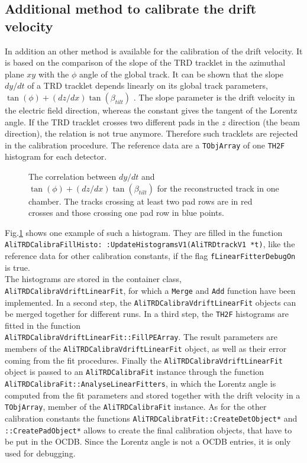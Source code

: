 \documentclass{alicetdr}
\begin{document}
\subsection{Additional method to calibrate the drift velocity}
In addition an other method is available for the calibration of the
drift velocity. It is based on the comparison of the slope of the TRD
tracklet in the azimuthal plane $xy$ with the $\phi$ angle of the
global track. It can be shown that the slope $dy/dt$ of a TRD tracklet
depends linearly on its global track parameters,
$\tan(\phi)+(dz/dx)\tan(\beta_{tilt})$ \cite{THESISR}. The slope
parameter is the drift velocity in the electric field direction,
whereas the constant gives the tangent of the Lorentz angle. If the
TRD tracklet crosses two different pads in the $z$ direction (the
beam direction), the relation is not true anymore. Therefore such
tracklets are rejected in the calibration procedure. The reference
data are a {\tt TObjArray} of one {\tt TH2F} histogram for each
detector.\\
\begin{figure}[hbt]
  \centering\mbox{}
  \caption{\label{crossrow}The correlation between $dy/dt$ and
$\tan(\phi)+(dz/dx)\tan(\beta_{tilt})$ for the reconstructed track
in one chamber. The tracks crossing at least two pad rows are in
red crosses and those crossing one pad row in blue points.}
\end{figure}

Fig.\ref{crossrow} shows one example of such a histogram. They are
filled in the function
\\{\tt AliTRDCalibraFillHisto: :UpdateHistogramsV1(AliTRDtrackV1 *t)},
like the reference data for other calibration constants, if the
flag {\tt fLinearFitterDebugOn} is true.\\
The histograms are stored in the container class,
\\{\tt AliTRDCalibraVdriftLinearFit}, for which a {\tt Merge} and
{\tt Add} function have been implemented. In a second step, the
{\tt AliTRDCalibraVdriftLinearFit} objects can be merged together
for different runs. In a third step, the {\tt TH2F} histograms are
fitted in the function \\{\tt AliTRDCalibraVdriftLinearFit::FillPEArray}.
The result parameters are members of the
{\tt AliTRDCalibraVdriftLinearFit} object, as well as their error
coming from the fit procedures. Finally the
{\tt AliTRDCalibraVdriftLinearFit} object is passed to an
{\tt AliTRDCalibraFit} instance through the function
{\tt AliTRDCalibraFit::AnalyseLinearFitters}, in which the Lorentz
angle is computed from the fit parameters and stored together with
the drift velocity in a {\tt TObjArray}, member of the
{\tt AliTRDCalibraFit} instance. As for the other calibration
constants the functions {\tt AliTRDCalibratFit::CreateDetObject*}
and {\tt ::CreatePadObject*} allows to create the final calibration
objects, that have to be put in the OCDB. Since the Lorentz angle
is not a OCDB entries, it is only used for debugging.
%
\end{document}
